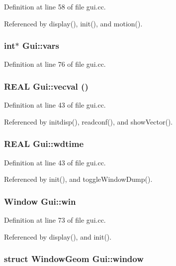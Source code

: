 Definition at line 58 of file gui.cc.

Referenced by display(), init(), and motion().\hypertarget{namespaceGui_6f927abe8b3833f6de26cd97440c1598}{
\subsubsection[{vars}]{\setlength{\rightskip}{0pt plus 5cm}int$\ast$ {\bf Gui::vars}}}
\label{namespaceGui_6f927abe8b3833f6de26cd97440c1598}




Definition at line 76 of file gui.cc.\hypertarget{namespaceGui_7cfc73b4cf3c43f2eae07648ed332adf}{
\subsubsection[{vecval}]{\setlength{\rightskip}{0pt plus 5cm}REAL {\bf Gui::vecval} ()}}
\label{namespaceGui_7cfc73b4cf3c43f2eae07648ed332adf}




Definition at line 43 of file gui.cc.

Referenced by initdisp(), readconf(), and showVector().\hypertarget{namespaceGui_4e0f39982d5320819b7ce9a6aec7ee4f}{
\subsubsection[{wdtime}]{\setlength{\rightskip}{0pt plus 5cm}REAL {\bf Gui::wdtime}}}
\label{namespaceGui_4e0f39982d5320819b7ce9a6aec7ee4f}




Definition at line 43 of file gui.cc.

Referenced by init(), and toggleWindowDump().\hypertarget{namespaceGui_ca6acfc184422daa4fa15bd0c6ce422b}{
\subsubsection[{win}]{\setlength{\rightskip}{0pt plus 5cm}Window {\bf Gui::win}}}
\label{namespaceGui_ca6acfc184422daa4fa15bd0c6ce422b}




Definition at line 73 of file gui.cc.

Referenced by display(), and init().\hypertarget{namespaceGui_32823865b86d01eb5cc0797ef95b72d1}{
\subsubsection[{window}]{\setlength{\rightskip}{0pt plus 5cm}struct {\bf WindowGeom} {\bf Gui::window}}}
\label{namespaceGui_32823865b86d01eb5cc0797ef95b72d1}




